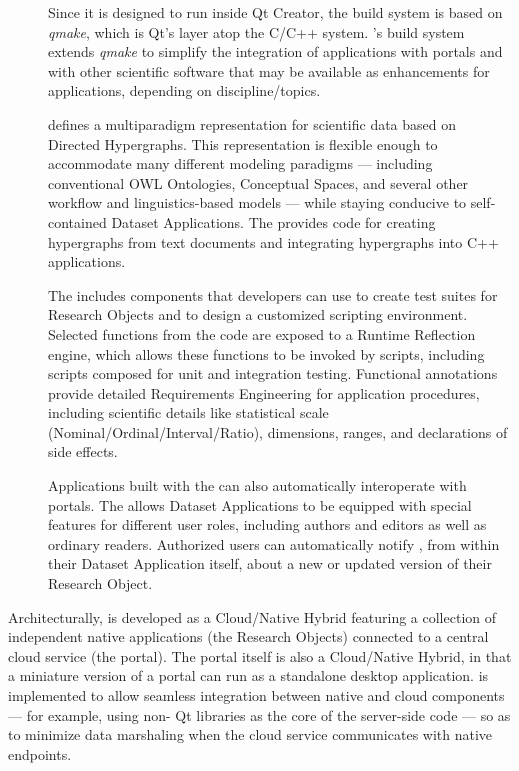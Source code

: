 \documentclass[11pt,letterpaper]{article}
\begin{document}
\begin{description}
\item[]  Since it is designed to run 
inside Qt Creator, the {\RAK} build system 
is based on \textit{qmake}, which is Qt's 
layer atop the C/C++  system.  
{\lfMOSAIC}'s build system extends \textit{qmake} to 
simplify the integration of {\RAK} applications 
with {\MOSAIC} portals and with other scientific 
software that may be available as enhancements 
for {\RAK} applications, depending on  
discipline/topics.
\item[]  
{\lfMOSAIC} defines a multiparadigm representation for 
scientific data based on Directed Hypergraphs.  
This representation is flexible enough to 
accommodate many different modeling 
paradigms --- including 
conventional OWL Ontologies, 
Conceptual Spaces, and 
several other workflow and linguistics-based models 
--- while staying conducive to self-contained 
Dataset Applications.  The {\MOSAIC} {\SDK} provides 
code for creating hypergraphs from text documents and 
integrating hypergraphs into C++ applications.
\item[]  The {\MOSAIC} {\SDK} includes 
components that developers can use to create 
test suites for Research Objects and to design a 
customized scripting environment.  Selected 
functions from the {\RO} code are exposed 
to a Runtime Reflection engine, which allows these 
functions to be invoked by scripts, including 
scripts composed for unit and integration testing.  
Functional annotations provide detailed Requirements 
Engineering for application procedures, including scientific 
details like statistical scale (Nominal/Ordinal/Interval/Ratio),
dimensions, ranges, and declarations of side effects.
\item[]  Applications built 
with the {\MOSAIC} {\SDK} can also automatically 
interoperate with {\MOSAIC} portals.  The {\SDK} 
allows Dataset Applications to be equipped 
with special features for different user roles, 
including authors and editors as well as ordinary readers.  
Authorized 
users can automatically notify {\MOSAIC}, 
from within their Dataset Application itself, about 
a new or updated version of their Research Object.
\end{description}
\p{}
Architecturally, {\MOSAIC} is developed as a 
Cloud/Native Hybrid featuring a collection of 
independent native applications (the {\RAK} 
Research Objects) connected to a central 
cloud service (the {\MOSAIC} portal).  The portal 
itself is also a Cloud/Native Hybrid, in that a 
miniature version of a {\MOSAIC} portal can run 
as a standalone desktop application.  {\lfMOSAIC} 
is implemented to allow seamless integration between 
native and cloud components --- for example, 
using non-{\GUI} Qt libraries as the core of the 
server-side code --- so as to minimize data 
marshaling when the cloud service 
communicates with native endpoints.
\end{document}
